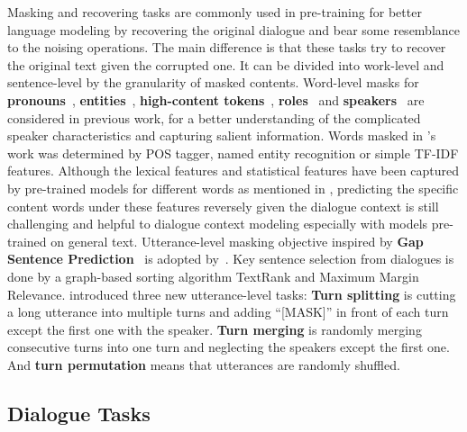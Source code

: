 Masking and recovering tasks 
are commonly used in pre-training for better language modeling by recovering the original dialogue and 
bear some resemblance to the noising operations. The main difference is that these tasks try to recover the original text given the corrupted one.
It can be divided into 
work-level and sentence-level by the granularity of masked contents.
Word-level masks for \textbf{pronouns}~\cite{khalifa2021bag}, \textbf{entities}~\cite{liu2022entity,khalifa2021bag}, 
\textbf{high-content tokens}~\cite{khalifa2021bag}, 
\textbf{roles}~\cite{qi2021improving} and \textbf{speakers}~\cite{zhong2021dialoglm} are 
considered in previous work, for a better understanding of the complicated speaker 
characteristics and capturing salient information. Words masked 
in \citet{khalifa2021bag}'s work was determined by POS tagger, 
named entity recognition or simple TF-IDF features. Although the lexical 
features and statistical features have been captured by pre-trained models 
for different words as mentioned in , predicting 
the specific content words under these features reversely given the dialogue context is still challenging and helpful to dialogue context modeling especially with models pre-trained on general text.
Utterance-level masking objective inspired by \textbf{Gap Sentence Prediction}~\cite{zhang2020pegasus} is adopted by~\citet{qi2021improving}. Key sentence selection from dialogues is done by a graph-based sorting algorithm TextRank and Maximum Margin Relevance. 
\citet{zhong2021dialoglm} introduced three new utterance-level tasks: 
\textbf{Turn splitting} is cutting a long utterance into multiple turns and 
adding ``[MASK]'' in front of each turn except the first one with 
the speaker. \textbf{Turn merging} is randomly merging consecutive turns 
into one turn and neglecting the speakers except the first one. 
And \textbf{turn permutation} means that utterances are randomly shuffled.

\subsection{Dialogue Tasks} 

